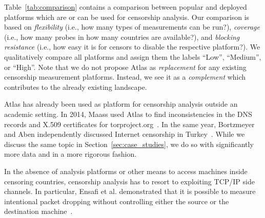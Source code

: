 Table~\ref{tab:comparison} contains a comparison between popular and deployed
platforms which are or can be used for censorship analysis.  Our comparison is
based on \emph{flexibility} (i.e., how many types of measurements can be run?),
\emph{coverage} (i.e., how many probes in how many countries are available?),
and \emph{blocking resistance} (i.e., how easy it is for censors to disable the
respective platform?).  We qualitatively compare all platforms and assign them
the labels ``Low'', ``Medium'', or ``High''.  Note that we do not propose
Atlas as \emph{replacement} for any existing censorship measurement platforms.
Instead, we see it as a \emph{complement} which contributes to the already
existing landscape.

Atlas has already been used as platform for censorship analysis outside an
academic setting.  In 2014, Maass used Atlas to find inconsistencies in the DNS
records and X.509 certificates for torproject.org~\cite{Maass2014}.  In the
same year, Bortzmeyer and Aben independently discussed Internet censorship in
Turkey~\cite{Bortzmeyer14,Aben14}.  While we discuss the same topic in
Section~\ref{sec:case_studies}, we do so with significantly more data and in a
more rigorous fashion.

In the absence of analysis platforms or other means to access machines inside
censoring countries, censorship analysis has to resort to exploiting TCP/IP
side channels.  In particular, Ensafi et al. demonstrated that it is possible
to measure intentional packet dropping without controlling either the source or
the destination machine~\cite{Ensafi2014}.
